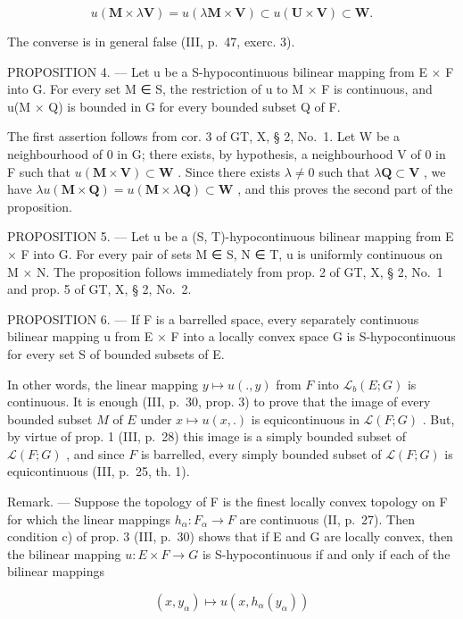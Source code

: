 \[
u (\mathbf {M} \times \lambda \mathbf {V}) = u (\lambda \mathbf {M} \times \mathbf {V}) \subset u (\mathbf {U} \times \mathbf {V}) \subset \mathbf {W}.
\]

The converse is in general false (III, p.~47, exerc. 3).

PROPOSITION 4. --- Let u be a S-hypocontinuous bilinear mapping from E × F into G. For every set M ∈ S, the restriction of u to M × F is continuous, and u(M × Q) is bounded in G for every bounded subset Q of F.

The first assertion follows from cor. 3 of GT, X, § 2, No.~1. Let W be a neighbourhood of 0 in G; there exists, by hypothesis, a neighbourhood V of 0 in F such that \(u(\mathbf{M} \times \mathbf{V}) \subset \mathbf{W}\) . Since there exists \(\lambda \neq 0\) such that \(\lambda \mathbf{Q} \subset \mathbf{V}\) , we have \(\lambda u(\mathbf{M} \times \mathbf{Q}) = u(\mathbf{M} \times \lambda \mathbf{Q}) \subset \mathbf{W}\) , and this proves the second part of the proposition.

PROPOSITION 5. --- Let u be a (S, T)-hypocontinuous bilinear mapping from E × F into G. For every pair of sets M ∈ S, N ∈ T, u is uniformly continuous on M × N. The proposition follows immediately from prop. 2 of GT, X, § 2, No.~1 and prop. 5 of GT, X, § 2, No.~2.

PROPOSITION 6. --- If F is a barrelled space, every separately continuous bilinear mapping u from E × F into a locally convex space G is S-hypocontinuous for every set S of bounded subsets of E.

In other words, the linear mapping \(y \mapsto u(., y)\) from \(F\) into \(\mathcal{L}_b(E; G)\) is continuous. It is enough (III, p.~30, prop. 3) to prove that the image of every bounded subset \(M\) of \(E\) under \(x \mapsto u(x, .)\) is equicontinuous in \(\mathcal{L}(F; G)\) . But, by virtue of prop. 1 (III, p.~28) this image is a simply bounded subset of \(\mathcal{L}(F; G)\) , and since \(F\) is barrelled, every simply bounded subset of \(\mathcal{L}(F; G)\) is equicontinuous (III, p.~25, th. 1).

Remark. --- Suppose the topology of F is the finest locally convex topology on F for which the linear mappings \(h_{\alpha}:F_{\alpha}\to F\) are continuous (II, p.~27). Then condition c) of prop. 3 (III, p.~30) shows that if E and G are locally convex, then the bilinear mapping \(u:E\times F\to G\) is S-hypocontinuous if and only if each of the bilinear mappings

\[
(x, y _ {\alpha}) \mapsto u (x, h _ {\alpha} (y _ {\alpha}))
\]

